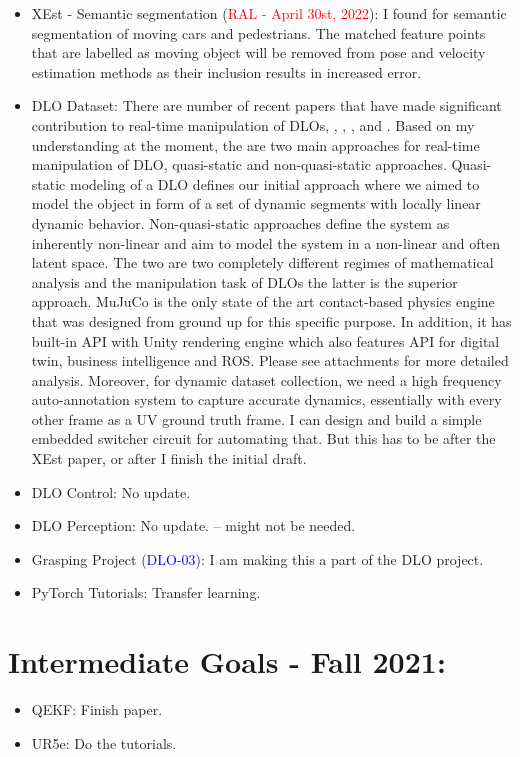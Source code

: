 \documentclass[11pt]{article}
\begin{document}
\begin{itemize}
    \item XEst - Semantic segmentation (\textcolor{red}{RAL - April 30st, 2022}):
    I found \cite{ballester2021dot} for semantic segmentation of moving cars and
    pedestrians. The matched feature points that are labelled as moving object
    will be removed from pose and velocity estimation methods as their inclusion
    results in increased error.

    \item DLO Dataset: There are number of recent papers that have made
    significant contribution to real-time manipulation of DLOs,
    \cite{zhang2021deformable}, \cite{zhang2020robots}, \cite{narang2021sim},
    and \cite{laezza2021reform}. Based on my understanding at the moment, the
    are two main approaches for real-time manipulation of DLO, quasi-static and
    non-quasi-static approaches. Quasi-static modeling of a DLO defines our
    initial approach where we aimed to model the object in form of a set of
    dynamic segments with locally linear dynamic behavior. Non-quasi-static
    approaches define the system as inherently non-linear and aim to model the
    system in a non-linear and often latent space. The two are two completely
    different regimes of mathematical analysis and the manipulation task of DLOs
    the latter is the superior approach. MuJuCo is the only state of the art
    contact-based physics engine that was designed from ground up for this
    specific purpose. In addition, it has built-in API with Unity rendering
    engine which also features API for digital twin, business intelligence and
    ROS. Please see attachments for more detailed analysis. Moreover, for
    dynamic dataset collection, we need a high frequency auto-annotation system
    to capture accurate dynamics, essentially with every other frame as a UV
    ground truth frame. I can design and build a simple embedded switcher circuit
    for automating that. But this has to be after the XEst paper, or after I
    finish the initial draft.

    \item DLO Control: No update.
    \item DLO Perception: No update. -- might not be needed.


    \item Grasping Project (\textcolor{blue}{DLO-03}): I am making this a part of the DLO project.
    \item PyTorch Tutorials: Transfer learning.

  \end{itemize}

\section{Intermediate Goals - Fall 2021:}
\begin{itemize}
      \item QEKF: Finish paper.
      \item UR5e: Do the tutorials.
\end{itemize}

\newpage

\newpage


\end{document}
